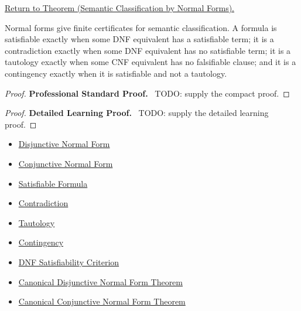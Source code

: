 \newpage
{}
\label{prf:normal-form-semantic-classification-propositional-logic}

\begin{remark*}[Return]
\hyperref[thm:normal-form-semantic-classification-propositional-logic]{Return to Theorem (Semantic Classification by Normal Forms).}
\end{remark*}

\begin{theorem*}
Normal forms give finite certificates for semantic classification. A formula is
satisfiable exactly when some DNF equivalent has a satisfiable term; it is a
contradiction exactly when some DNF equivalent has no satisfiable term; it is a
tautology exactly when some CNF equivalent has no falsifiable clause; and it is
a contingency exactly when it is satisfiable and not a tautology.
\end{theorem*}

\begin{proof}
\textbf{Professional Standard Proof.}~
TODO: supply the compact proof.
\end{proof}

\begin{proof}
\textbf{Detailed Learning Proof.}~
TODO: supply the detailed learning proof.
\end{proof}

\begin{remark*}
\end{remark*}

\begin{dependencies}
\begin{itemize}
  \item \hyperref[def:disjunctive-normal-form-propositional-logic]{Disjunctive Normal Form}
  \item \hyperref[def:conjunctive-normal-form-propositional-logic]{Conjunctive Normal Form}
  \item \hyperref[def:satisfiable-formula-propositional-logic]{Satisfiable Formula}
  \item \hyperref[def:contradiction-propositional-logic]{Contradiction}
  \item \hyperref[def:tautology-propositional-logic]{Tautology}
  \item \hyperref[def:contingency-propositional-logic]{Contingency}
  \item \hyperref[thm:dnf-satisfiability-criterion-propositional-logic]{DNF Satisfiability Criterion}
  \item \hyperref[thm:canonical-disjunctive-normal-form-propositional-logic]{Canonical Disjunctive Normal Form Theorem}
  \item \hyperref[thm:canonical-conjunctive-normal-form-propositional-logic]{Canonical Conjunctive Normal Form Theorem}
\end{itemize}
\end{dependencies}

\clearpage
